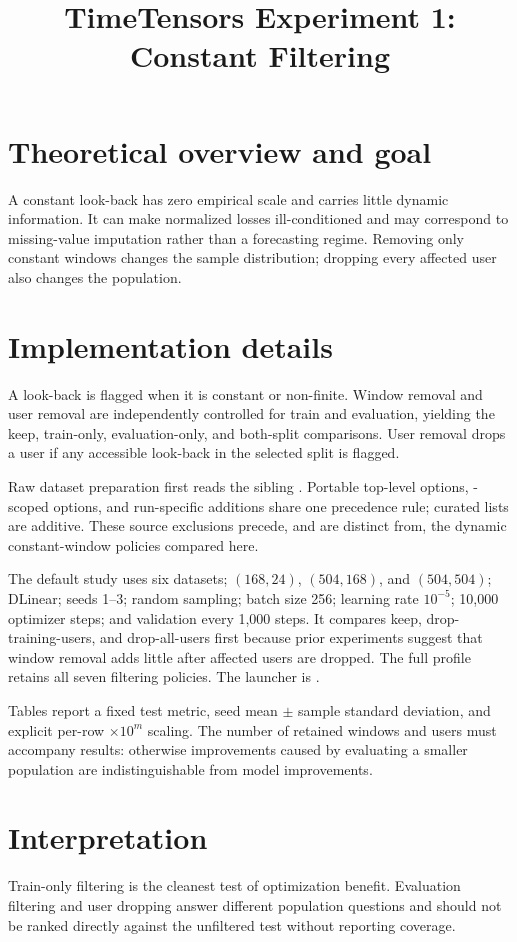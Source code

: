 \documentclass[10pt]{article}
\title{TimeTensors Experiment 1: Constant Filtering}
\author{}
\date{}
\begin{document}
\maketitle
\section{Theoretical overview and goal}
A constant look-back has zero empirical scale and carries little dynamic
information.  It can make normalized losses ill-conditioned and may correspond
to missing-value imputation rather than a forecasting regime.  Removing only
constant windows changes the sample distribution; dropping every affected user
also changes the population.


\section{Implementation details}
A look-back is flagged when it is constant or non-finite.  Window removal and
user removal are independently controlled for train and evaluation, yielding
the keep, train-only, evaluation-only, and both-split comparisons.  User removal
drops a user if any accessible look-back in the selected split is flagged.

Raw dataset preparation first reads the sibling . Portable
top-level options, -scoped options, and run-specific additions
share one precedence rule; curated  lists are additive. These
source exclusions precede, and are distinct from, the dynamic constant-window
policies compared here.

The default study uses six datasets; $(168,24)$, $(504,168)$, and $(504,504)$;
DLinear; seeds 1--3; random sampling; batch size 256; learning rate $10^{-5}$;
10,000 optimizer steps; and validation every 1,000 steps. It compares keep,
drop-training-users, and drop-all-users first because prior experiments suggest
that window removal adds little after affected users are dropped. The full
profile retains all seven filtering policies. The launcher is
.

Tables report a fixed test metric, seed mean $\pm$ sample standard deviation,
and explicit per-row $\times10^m$ scaling.  The number of retained windows and
users must accompany results: otherwise improvements caused by evaluating a
smaller population are indistinguishable from model improvements.

\section{Interpretation}
Train-only filtering is the cleanest test of optimization benefit.  Evaluation
filtering and user dropping answer different population questions and should
not be ranked directly against the unfiltered test without reporting coverage.
\end{document}

